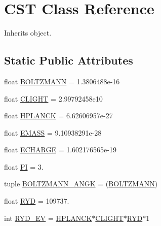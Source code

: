 \hypertarget{classpyneb_1_1utils_1_1physics_1_1_c_s_t}{\section{C\-S\-T Class Reference}
\label{classpyneb_1_1utils_1_1physics_1_1_c_s_t}
}


Inherits object.

\subsection*{Static Public Attributes}
\begin{DoxyCompactItemize}
\item 
float \hyperlink{classpyneb_1_1utils_1_1physics_1_1_c_s_t_a10bc94b084629bc227f8317335dff431}{B\-O\-L\-T\-Z\-M\-A\-N\-N} = 1.\-3806488e-\/16
\item 
float \hyperlink{classpyneb_1_1utils_1_1physics_1_1_c_s_t_a07b7f370730de2710e80bf55753bc64c}{C\-L\-I\-G\-H\-T} = 2.\-99792458e10
\item 
float \hyperlink{classpyneb_1_1utils_1_1physics_1_1_c_s_t_ac6b3322e77438ceaca8776f2700d4b75}{H\-P\-L\-A\-N\-C\-K} = 6.\-62606957e-\/27
\item 
float \hyperlink{classpyneb_1_1utils_1_1physics_1_1_c_s_t_a5387ad536e3559f1910a5b9d8e99ba71}{E\-M\-A\-S\-S} = 9.\-10938291e-\/28
\item 
float \hyperlink{classpyneb_1_1utils_1_1physics_1_1_c_s_t_a63b5893974bf6c0149f3616672070966}{E\-C\-H\-A\-R\-G\-E} = 1.\-602176565e-\/19
\item 
float \hyperlink{classpyneb_1_1utils_1_1physics_1_1_c_s_t_a4c43e2b8db2027e48251350d972a39c2}{P\-I} = 3.
\item 
tuple \hyperlink{classpyneb_1_1utils_1_1physics_1_1_c_s_t_a875172553ae6c267f2a125be4c8ea1e4}{B\-O\-L\-T\-Z\-M\-A\-N\-N\-\_\-\-A\-N\-G\-K} = (\hyperlink{classpyneb_1_1utils_1_1physics_1_1_c_s_t_a10bc94b084629bc227f8317335dff431}{B\-O\-L\-T\-Z\-M\-A\-N\-N})
\item 
float \hyperlink{classpyneb_1_1utils_1_1physics_1_1_c_s_t_a9486e888feff666351927a0cb76651a2}{R\-Y\-D} = 109737.
\item 
int \hyperlink{classpyneb_1_1utils_1_1physics_1_1_c_s_t_a3a526fd5290b7527a59057993afdd7b4}{R\-Y\-D\-\_\-\-E\-V} = \hyperlink{classpyneb_1_1utils_1_1physics_1_1_c_s_t_ac6b3322e77438ceaca8776f2700d4b75}{H\-P\-L\-A\-N\-C\-K}$\ast$\hyperlink{classpyneb_1_1utils_1_1physics_1_1_c_s_t_a07b7f370730de2710e80bf55753bc64c}{C\-L\-I\-G\-H\-T}$\ast$\hyperlink{classpyneb_1_1utils_1_1physics_1_1_c_s_t_a9486e888feff666351927a0cb76651a2}{R\-Y\-D}$\ast$1

\end{DoxyCompactItemize}
